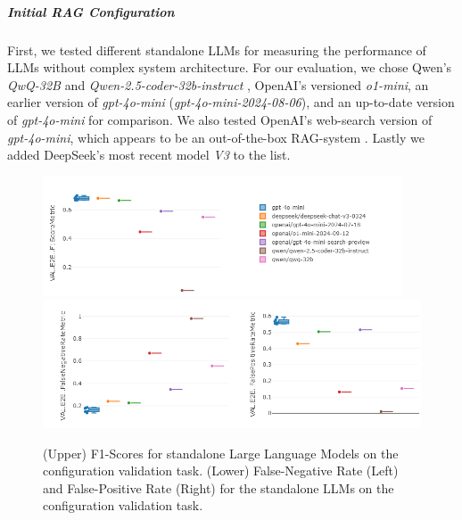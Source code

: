 \subparagraph{Initial RAG Configuration} 
First, we tested different standalone LLMs for measuring the performance of LLMs without complex system architecture. For our evaluation, we chose Qwen's \textit{QwQ-32B} \cite{qwq32b} and \textit{Qwen-2.5-coder-32b-instruct} \cite{hui2024qwen2}\cite{qwen2}\cite{qwen2.5}, OpenAI's versioned \textit{o1-mini}, an earlier version of \textit{gpt-4o-mini} (\textit{gpt-4o-mini-2024-08-06}), and an up-to-date version of \textit{gpt-4o-mini} for comparison. We also tested OpenAI's web-search version of \textit{gpt-4o-mini}, which appears to be an out-of-the-box RAG-system \cite{OpenAI_2022}. Lastly we added DeepSeek's most recent model \textit{V3} \cite{deepseekai2024deepseekv3technicalreport} to the list. 

\begin{figure}[!ht]
    \centering
    \includegraphics[width=0.95\textwidth]{images/LLMStandalone-by-model.png}\\[6pt]
    \includegraphics[width=\textwidth]{images/LLMStandalone-by-model-FNRFPR.png}
    \caption{(Upper) F1-Scores for standalone Large Language Models on the configuration validation task. (Lower) False-Negative Rate (Left) and False-Positive Rate (Right) for the standalone LLMs on the configuration validation task.}
    \label{fig:LLMStandalone-Results}
  \end{figure}


